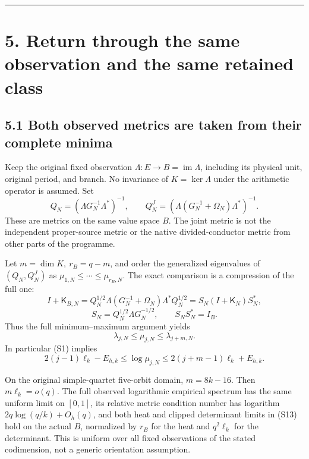 \documentclass[11pt]{article}
\begin{document}
\begin{center}\rule{0.5\linewidth}{0.5pt}\end{center}

\section{5. Return through the same observation and the same retained class}\label{return-through-the-same-observation-and-the-same-retained-class}

\subsection{5.1 Both observed metrics are taken from their complete minima}\label{both-observed-metrics-are-taken-from-their-complete-minima}

Keep the original fixed observation \(\Lambda:E\to B=\operatorname{im}\Lambda\), including its physical unit, original period, and branch. No invariance of \(K=\ker\Lambda\) under the arithmetic operator is assumed. Set \[
 Q_N=(\Lambda G_N^{-1}\Lambda^*)^{-1},\qquad
 Q_N^J=(\Lambda(G_N^{-1}+\Omega_N)\Lambda^*)^{-1}. \tag{O1}
\] These are metrics on the same value space \(B\). The joint metric is not the independent proper-source metric or the native divided-conductor metric from other parts of the programme.

Let \(m=\dim K,\ r_B=q-m\), and order the generalized eigenvalues of \((Q_N,Q_N^J)\) as \(\mu_{1,N}\le\cdots\le\mu_{r_B,N}\). The exact comparison is a compression of the full one: \[
 I+\mathsf K_{B,N}
 =Q_N^{1/2}\Lambda(G_N^{-1}+\Omega_N)\Lambda^*Q_N^{1/2}
 =S_N(I+\mathsf K_N)S_N^*,
\] \[
 S_N=Q_N^{1/2}\Lambda G_N^{-1/2},\qquad S_NS_N^*=I_B. \tag{O2}
\] Thus the full minimum--maximum argument yields \[
 \boxed{\lambda_{j,N}\le\mu_{j,N}\le\lambda_{j+m,N}.} \tag{O3}
\] In particular (S1) implies \[
 2(j-1)\ell_k-E_{h,k}
 \le\log\mu_{j,N}
 \le2(j+m-1)\ell_k+E_{h,k}. \tag{O4}
\]

On the original simple-quartet five-orbit domain, \(m=8k-16\). Then \(m\ell_k=o(q)\). The full observed logarithmic empirical spectrum has the same uniform limit on \([0,1]\), its relative metric condition number has logarithm \(2q\log(q/k)+O_h(q)\), and both heat and clipped determinant limits in (S13) hold on the actual \(B\), normalized by \(r_B\) for the heat and \(q^2\ell_k\) for the determinant. This is uniform over all fixed observations of the stated codimension, not a generic orientation assumption.
\end{document}

